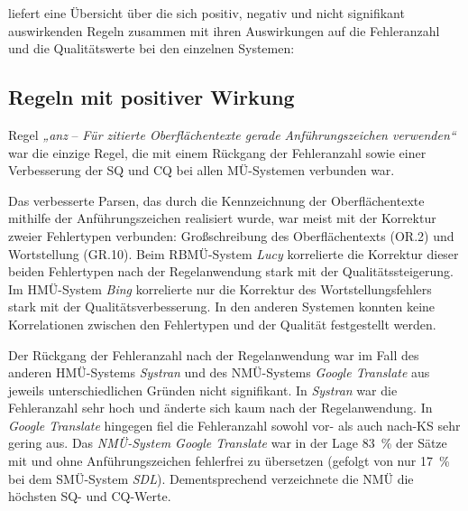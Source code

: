  liefert eine Übersicht über die sich positiv, negativ und nicht signifikant auswirkenden Regeln zusammen mit ihren Auswirkungen auf die Fehleranzahl und die Qualitätswerte bei den einzelnen Systemen:

\subsection{Regeln mit positiver Wirkung}

Regel \textit{„anz} -- \textit{Für zitierte Oberflächentexte gerade Anführungszeichen verwenden“} war die einzige Regel, die mit einem Rückgang der Fehleranzahl sowie einer Verbesserung der SQ und CQ bei allen MÜ-Systemen verbunden war.

Das verbesserte Parsen, das durch die Kennzeichnung der Oberflächentexte mithilfe der Anführungszeichen realisiert wurde, war meist mit der Korrektur zweier Fehlertypen verbunden: Großschreibung des Oberflächentexts (OR.2) und Wortstellung (GR.10). Beim RBMÜ-System \textit{Lucy} korrelierte die Korrektur dieser beiden Fehlertypen nach der Regelanwendung stark mit der Qualitätssteigerung. Im HMÜ-System \textit{Bing} korrelierte nur die Korrektur des Wortstellungsfehlers stark mit der Qualitätsverbesserung. In den anderen Systemen konnten keine Korrelationen zwischen den Fehlertypen und der Qualität festgestellt werden.

Der Rückgang der Fehleranzahl nach der Regelanwendung war im Fall des anderen HMÜ-Systems \textit{Systran} und des NMÜ-Systems \textit{Google Translate} aus jeweils unterschiedlichen Gründen nicht signifikant. In \textit{Systran} war die Fehleranzahl sehr hoch und änderte sich kaum nach der Regelanwendung. In \textit{Google Translate} hingegen fiel die Fehleranzahl sowohl vor- als auch nach-KS sehr gering aus. Das \textit{NMÜ-System Google Translate} war in der Lage 83~\% der Sätze mit und ohne Anführungszeichen fehlerfrei zu übersetzen (gefolgt von nur 17~\% bei dem SMÜ-System \textit{SDL}). Dementsprechend verzeichnete die NMÜ die höchsten SQ- und CQ-Werte.

